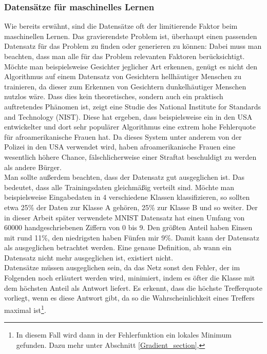 \documentclass[11pt]{article}
\begin{document}
\subsubsection{Datensätze für maschinelles Lernen}
Wie bereits erwähnt, sind die Datensätze oft der limitierende Faktor beim maschinellen Lernen. Das gravierendste Problem ist, überhaupt einen passenden Datensatz für das Problem zu finden oder generieren zu können: Dabei muss man beachten, dass man alle für das Problem relevanten Faktoren berücksichtigt. Möchte man beispielsweise Gesichter jeglicher Art erkennen, genügt es nicht den Algorithmus auf einem Datensatz von Gesichtern hellhäutiger Menschen zu trainieren, da dieser zum Erkennen von Gesichtern dunkelhäutiger Menschen nutzlos wäre. Dass dies kein theoretisches, sondern auch ein praktisch auftretendes Phänomen ist, zeigt eine Studie des National Institute for Standards and Technology (NIST)\cite{5}. Diese hat ergeben, dass beispielsweise ein in den USA entwickelter und dort sehr populärer Algorithmus eine extrem hohe Fehlerquote für afroamerikanische Frauen hat. Da dieses System unter anderem von der Polizei in den USA verwendet wird, haben afroamerikanische Frauen eine wesentlich höhere Chance, fälschlicherweise einer Straftat beschuldigt zu werden als andere Bürger.\\
Man sollte außerdem beachten, dass der Datensatz gut ausgeglichen ist. Das bedeutet, dass alle Trainingsdaten gleichmäßig verteilt sind. Möchte man beispielsweise Eingabedaten in 4 verschiedene Klassen klassifizieren, so sollten etwa 25\% der Daten zur Klasse A gehören, 25\% zur Klasse B und so weiter. Der in dieser Arbeit später verwendete MNIST Datensatz hat einen Umfang von 60000 handgeschriebenen Ziffern von 0 bis 9. Den größten Anteil haben Einsen mit rund 11\%, den niedrigsten haben Fünfen mir 9\%. Damit kann der Datensatz als ausgeglichen betrachtet werden. Eine genaue Definition, ab wann ein Datensatz nicht mehr ausgeglichen ist, existiert nicht.\\
Datensätze müssen ausgeglichen sein, da das Netz sonst den Fehler, der im Folgenden noch erläutert werden wird, minimiert, indem es öfter die Klasse mit dem höchsten Anteil als Antwort liefert. Es erkennt, dass die höchste Trefferquote vorliegt, wenn es diese Antwort gibt, da so die Wahrscheinlichkeit eines Treffers maximal ist\footnote{In diesem Fall wird dann in der Fehlerfunktion ein lokales Minimum gefunden. Dazu mehr unter Abschnitt \ref{Gradient_section}, }.
\end{document}
